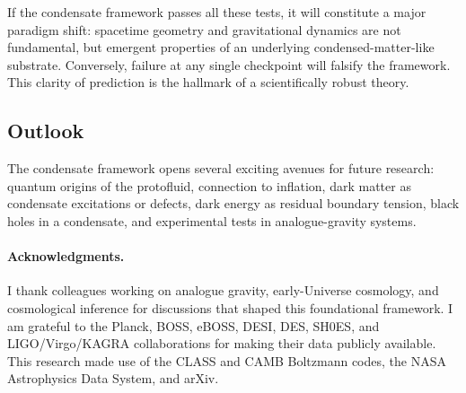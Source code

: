 \documentclass[11pt,a4paper]{article}
\theoremstyle{definition}
\begin{document}
If the condensate framework passes all these tests, it will constitute a major paradigm shift: spacetime geometry and gravitational dynamics are not fundamental, but emergent properties of an underlying condensed-matter-like substrate. Conversely, failure at any single checkpoint will falsify the framework. This clarity of prediction is the hallmark of a scientifically robust theory.

\subsection{Outlook}
\label{sec:outlook}

The condensate framework opens several exciting avenues for future research: quantum origins of the protofluid, connection to inflation, dark matter as condensate excitations or defects, dark energy as residual boundary tension, black holes in a condensate, and experimental tests in analogue-gravity systems.

\paragraph{Acknowledgments.}
I thank colleagues working on analogue gravity, early-Universe cosmology, and cosmological inference for discussions that shaped this foundational framework. I am grateful to the Planck, BOSS, eBOSS, DESI, DES, SH0ES, and LIGO/Virgo/KAGRA collaborations for making their data publicly available. This research made use of the CLASS and CAMB Boltzmann codes, the NASA Astrophysics Data System, and arXiv.
\end{document}
